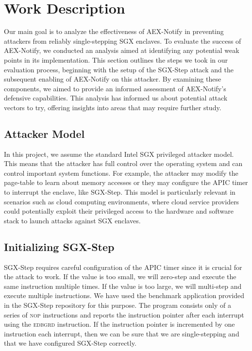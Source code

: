 \documentclass{llncs}
\begin{document}
\section{Work Description}

Our main goal is to analyze the effectiveness of AEX-Notify
in preventing attackers from reliably single-stepping SGX enclaves.
To evaluate the success of AEX-Notify, we conducted an analysis aimed at
identifying any potential weak points in its implementation.
This section outlines the steps we took in our evaluation process,
beginning with the setup of the SGX-Step attack and
the subsequent enabling of AEX-Notify on this attacker.
By examining these components,
we aimed to provide an informed assessment of AEX-Notify’s defensive capabilities.
This analysis has informed us about potential attack vectors to try,
offering insights into areas that may require further study.

\subsection{Attacker Model}

In this project, we assume the standard Intel SGX privileged attacker model.
This means that the attacker has full control over the operating system
and can control important system functions.
For example, the attacker may modify the page-table to learn about memory accesses
or they may configure the APIC timer to interrupt the enclave, like SGX-Step.
This model is particularly relevant in scenarios such as cloud computing
environments, where cloud service providers could potentially exploit their
privileged access to the hardware and software stack to launch attacks against SGX enclaves.

\subsection{Initializing SGX-Step}


SGX-Step requires careful configuration of the APIC timer
since it is crucial for the attack to work.
If the value is too small, we will zero-step and execute the same instruction multiple times.
If the value is too large, we will multi-step and execute multiple instructions.
We have used the benchmark application provided in the SGX-Step repository for this purpose.
The program consists only of a series of \textsc{nop} instructions and
reports the instruction pointer after each interrupt using the \textsc{edbgrd} instruction.
If the instruction pointer is incremented by one instruction each interrupt,
then we can be sure that we are single-stepping and
that we have configured SGX-Step correctly.
\end{document}
